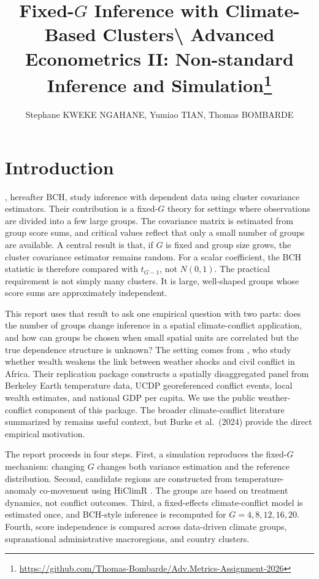 \documentclass[
]{article}
\title{\Large \textbf{Fixed-\(G\) Inference with Climate-Based Clusters}\textbackslash{}
\large Advanced Econometrics II: Non-standard Inference and
Simulation\footnote{\url{https://github.com/Thomas-Bombarde/Adv.Metrics-Assignment-2026}}}
\author{Stephane KWEKE NGAHANE, Yumiao TIAN, Thomas BOMBARDE}
\date{}
\begin{document}
\maketitle

\section{Introduction}

\citet{bester_conley_hansen_2011}, hereafter BCH, study inference with
dependent data using cluster covariance estimators. Their contribution
is a fixed-\(G\) theory for settings where observations are divided into
a few large groups. The covariance matrix is estimated from group score
sums, and critical values reflect that only a small number of groups are
available. A central result is that, if \(G\) is fixed and group size
grows, the cluster covariance estimator remains random. For a scalar
coefficient, the BCH statistic is therefore compared with \(t_{G-1}\),
not \(N(0,1)\). The practical requirement is not simply many clusters.
It is large, well-shaped groups whose score sums are approximately
independent.

This report uses that result to ask one empirical question with two
parts: does the number of groups change inference in a spatial
climate-conflict application, and how can groups be chosen when small
spatial units are correlated but the true dependence structure is
unknown? The setting comes from \citet{burke2024}, who study whether
wealth weakens the link between weather shocks and civil conflict in
Africa. Their replication package constructs a spatially disaggregated
panel from Berkeley Earth temperature data, UCDP georeferenced conflict
events, local wealth estimates, and national GDP per capita. We use the
public weather-conflict component of this package. The broader
climate-conflict literature summarized by
\citet{hsiang_burke_miguel_2013} remains useful context, but Burke et
al.~(2024) provide the direct empirical motivation.

The report proceeds in four steps. First, a simulation reproduces the
fixed-\(G\) mechanism: changing \(G\) changes both variance estimation
and the reference distribution. Second, candidate regions are
constructed from temperature-anomaly co-movement using HiClimR
\citep{badr_zaitchik_dezfuli_2015}. The groups are based on treatment
dynamics, not conflict outcomes. Third, a fixed-effects climate-conflict
model is estimated once, and BCH-style inference is recomputed for
\(G=4,8,12,16,20\). Fourth, score independence is compared across
data-driven climate groups, supranational administrative macroregions,
and country clusters.
\end{document}
